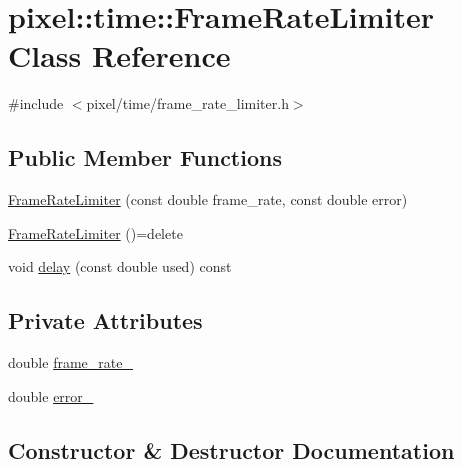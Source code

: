 \hypertarget{classpixel_1_1time_1_1_frame_rate_limiter}{}\section{pixel\+:\+:time\+:\+:Frame\+Rate\+Limiter Class Reference}
\label{classpixel_1_1time_1_1_frame_rate_limiter}


{\ttfamily \#include $<$pixel/time/frame\+\_\+rate\+\_\+limiter.\+h$>$}

\subsection*{Public Member Functions}
\begin{DoxyCompactItemize}
\item 
\hyperlink{classpixel_1_1time_1_1_frame_rate_limiter_ac4206c380b8d7e6ada9453dfd1c34753}{Frame\+Rate\+Limiter} (const double frame\+\_\+rate, const double error)
\item 
\hyperlink{classpixel_1_1time_1_1_frame_rate_limiter_a90cee90daa8ec13bdb159f23f0a830a3}{Frame\+Rate\+Limiter} ()=delete
\item 
void \hyperlink{classpixel_1_1time_1_1_frame_rate_limiter_af21dd5d6c44237e3080a955807f399f2}{delay} (const double used) const
\end{DoxyCompactItemize}
\subsection*{Private Attributes}
\begin{DoxyCompactItemize}
\item 
double \hyperlink{classpixel_1_1time_1_1_frame_rate_limiter_aa0603f91db3ef92e0f36c01da7b0fcfa}{frame\+\_\+rate\+\_\+}
\item 
double \hyperlink{classpixel_1_1time_1_1_frame_rate_limiter_aad9f154a917aa4d5751535bf129fc290}{error\+\_\+}
\end{DoxyCompactItemize}


\subsection{Constructor \& Destructor Documentation}
\mbox{\label{classpixel_1_1time_1_1_frame_rate_limiter_ac4206c380b8d7e6ada9453dfd1c34753}} 
